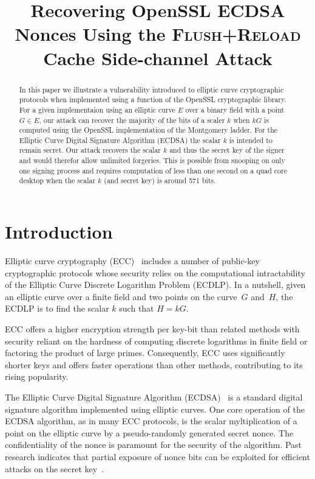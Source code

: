 \documentclass{llncs}
\begin{document}
\title{Recovering OpenSSL ECDSA Nonces Using the \textsc{Flush+Reload} Cache Side-channel Attack}

\maketitle

\begin{abstract}
In this paper we illustrate a vulnerability introduced to elliptic curve cryptographic protocols when implemented using a function of the OpenSSL cryptographic library. For a given implementaion using an elliptic curve $E$ over a binary field with a point $G\in E$, our attack can recover the majority of the bits of a scaler $k$ when $kG$ is computed using the OpenSSL implementation of the Montgomery ladder. For the Elliptic Curve Digital Signature Algorithm (ECDSA) the scalar $k$ is intended to remain secret. Our attack recovers the scalar $k$ and thus the secret key of the signer and would therefor allow unlimited forgeries. This is possible from snooping on only one signing process and requires computation of less than one second on a quad core desktop when the scalar $k$ (and secret key) is around 571 bits.

\end{abstract}

\section{Introduction}
Elliptic curve cryptography (ECC)~\cite{miller85use,koblitz87elliptic} includes a number of public-key cryptographic protocols whose security relies on the computational intractability of the Elliptic Curve Discrete Logarithm Problem (ECDLP).
In a nutshell, given an elliptic curve over a finite field and two points on the curve~$G$ and~$H$, the ECDLP is to find the scalar $k$ such that $H=kG$.

ECC offers a higher encryption strength per key-bit than related methods with security reliant on the hardness of computing discrete logarithms in finite field or factoring the product of large primes.
Consequently, ECC uses significantly shorter keys and offers faster operations than other methods, contributing to its rising popularity.

The Elliptic Curve Digital Signature Algorithm (ECDSA)~\cite{johnson01elliptic,fips186,ansi962} is a standard
digital signature algorithm implemented using elliptic curves. One core operation of the ECDSA algorithm, as in many ECC protocols, is the scalar myltiplication of a point on the elliptic curve by a pseudo-randomly generated secret nonce. The confidentiality of the nonce is paramount for the security of the algorithm. Past research indicates that partial exposure of nonce bits can be exploited for efficient attacks on the secret key~\cite{nguyen03insecurity,brumley11remote}.
\end{document}
